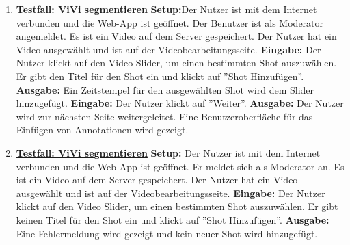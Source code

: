 \begin{enumerate}
	\item \underline{\textbf{Testfall: ViVi segmentieren}} \linebreak
	\textbf{Setup:}Der Nutzer ist mit dem Internet verbunden und die Web-App ist geöffnet. Der Benutzer ist als Moderator angemeldet. Es ist ein Video auf dem Server gespeichert. Der Nutzer hat ein Video ausgewählt und ist auf der Videobearbeitungsseite.\linebreak
	\textbf{Eingabe:} Der Nutzer klickt auf den Video Slider, um einen bestimmten Shot auszuwählen. Er gibt den Titel für den Shot ein und klickt auf ''Shot Hinzufügen''. \linebreak
	\textbf{Ausgabe:} Ein Zeitstempel für den ausgewählten Shot wird dem Slider hinzugefügt.\linebreak
	\textbf{Eingabe:} Der Nutzer klickt auf ''Weiter''. \linebreak
	\textbf{Ausgabe:} Der Nutzer wird zur nächsten Seite weitergeleitet. Eine Benutzeroberfläche für das Einfügen von Annotationen wird gezeigt.
	
	\item \underline{\textbf{Testfall: ViVi segmentieren}} \linebreak
	\textbf{Setup:} Der Nutzer ist mit dem Internet verbunden und die Web-App ist geöffnet. Er meldet sich als Moderator an. Es ist ein Video auf dem Server gespeichert. Der Nutzer hat ein Video ausgewählt und ist auf der Videobearbeitungsseite.\linebreak
	\textbf{Eingabe:} Der Nutzer klickt auf den Video Slider, um einen bestimmten Shot auszuwählen. Er gibt keinen Titel für den Shot ein und klickt auf ''Shot Hinzufügen''. \linebreak
	\textbf{Ausgabe:} Eine Fehlermeldung wird gezeigt und kein neuer Shot wird hinzugefügt.
	
	

\end{enumerate}
